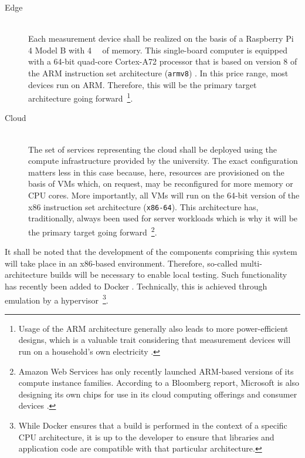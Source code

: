 \begin{description}
  \item[Edge]
  \hfill \\
  Each measurement device shall be realized on the basis of a Raspberry Pi 4 Model B with \SI{4}{\giga\byte} of memory. This single-board computer is equipped with a 64-bit quad-core Cortex-A72 processor that is based on version 8 of the \acs{ARM} instruction set architecture (\texttt{armv8}) \cite{raspberrypi4} \cite{arm2020v8a}. In this price range, most devices run on \acs{ARM}. Therefore, this will be the primary target architecture going forward~\footnote{Usage of the \acs{ARM} architecture generally also leads to more power-efficient designs, which is a valuable trait considering that measurement devices will run on a household's own electricity \cite[p.~8837]{morabito2017virtualization}.}.

  \item[Cloud]
  \hfill \\
  The set of services representing the cloud shall be deployed using the compute infrastructure provided by the university. The exact configuration matters less in this case because, here, resources are provisioned on the basis of \acsp{VM} which, on request, may be reconfigured for more memory or \acs{CPU} cores. More importantly, all \acsp{VM} will run on the 64-bit version of the x86 instruction set architecture (\texttt{x86-64}). This architecture has, traditionally, always been used for server workloads which is why it will be the primary target going forward~\footnote{Amazon Web Services has only recently launched \acs{ARM}-based versions of its compute instance families. According to a Bloomberg report, Microsoft is also designing its own chips for use in its cloud computing offerings and consumer devices \cite{bloomberg2020microsoft}.}.
\end{description}

It shall be noted that the development of the components comprising this system will take place in an x86-based environment. Therefore, so-called multi-architecture builds will be necessary to enable local testing. Such functionality has recently been added to Docker \cite{docker2020multi}. Technically, this is achieved through emulation by a hypervisor~\footnote{While Docker ensures that a build is performed in the context of a specific \acs{CPU} architecture, it is up to the developer to ensure that libraries and application code are compatible with that particular architecture.}.


